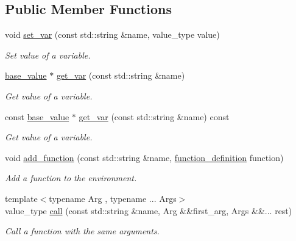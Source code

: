 \subsection*{Public Member Functions}
\begin{DoxyCompactItemize}
\item 
void \mbox{\hyperlink{classdice_1_1environment_a5bf1f80a5a2958ac8bb1c546535bdfde}{set\+\_\+var}} (const std\+::string \&name, value\+\_\+type value)
\begin{DoxyCompactList}\small\item\em Set value of a variable. \end{DoxyCompactList}\item 
\mbox{\hyperlink{classdice_1_1base__value}{base\+\_\+value}} $\ast$ \mbox{\hyperlink{classdice_1_1environment_abbad399163a648c24c2c7fa7bd5ce28b}{get\+\_\+var}} (const std\+::string \&name)
\begin{DoxyCompactList}\small\item\em Get value of a variable. \end{DoxyCompactList}\item 
const \mbox{\hyperlink{classdice_1_1base__value}{base\+\_\+value}} $\ast$ \mbox{\hyperlink{classdice_1_1environment_a9b94a618129c7af01958a857a703e29f}{get\+\_\+var}} (const std\+::string \&name) const
\begin{DoxyCompactList}\small\item\em Get value of a variable. \end{DoxyCompactList}\item 
void \mbox{\hyperlink{classdice_1_1environment_aa536347c73a806f197f6f61348235b47}{add\+\_\+function}} (const std\+::string \&name, \mbox{\hyperlink{classdice_1_1function__definition}{function\+\_\+definition}} function)
\begin{DoxyCompactList}\small\item\em Add a function to the environment. \end{DoxyCompactList}\item 
{\footnotesize template$<$typename Arg , typename ... Args$>$ }\\value\+\_\+type \mbox{\hyperlink{classdice_1_1environment_a381055a5eb8f4064361e97236f6e80e1}{call}} (const std\+::string \&name, Arg \&\&first\+\_\+arg, Args \&\&... rest)
\begin{DoxyCompactList}\small\item\em Call a function with the same arguments. \end{DoxyCompactList}\item 

\end{DoxyCompactItemize}
